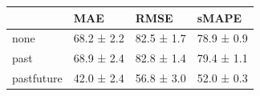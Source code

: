 \begin{tabular}{llll}
\toprule
 & MAE & RMSE & sMAPE \\
\midrule
none & 68.2 ± 2.2 & 82.5 ± 1.7 & 78.9 ± 0.9 \\
past & 68.9 ± 2.4 & 82.8 ± 1.4 & 79.4 ± 1.1 \\
pastfuture & 42.0 ± 2.4 & 56.8 ± 3.0 & 52.0 ± 0.3 \\
\bottomrule
\end{tabular}
